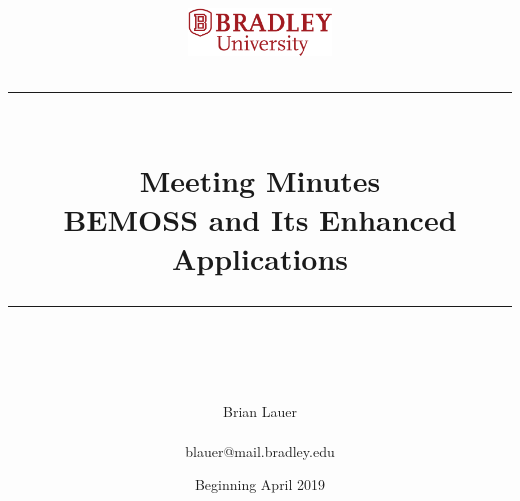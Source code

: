 \documentclass[fontsize=11pt, %
                             paper=letter, %
                             twoside, %
                             captions=tableheading,
                             index=totoc,
                             hyperref]{labbook}
\newcommand{\HRule}{\rule{\linewidth}{0.5mm}} %
\begin{document}


%

\title{
\begin{center}
\href{http://www.bradley.edu}{\includegraphics[height=0.5in]{figs/logoBU1-Print}}
\vskip10pt
\HRule \\[0.4cm]
{\Huge \bfseries Meeting Minutes \\[0.5cm] \Large BEMOSS and Its Enhanced Applications}\\[0.4cm] %
\HRule \\[1.5cm]
\end{center}
}
\author{\Huge Brian Lauer \\ \\ \LARGE blauer@mail.bradley.edu \\[2cm]} %
\date{Beginning April 2019} %
\maketitle


\printindex
\tableofcontents %
\newpage %
\end{document}
